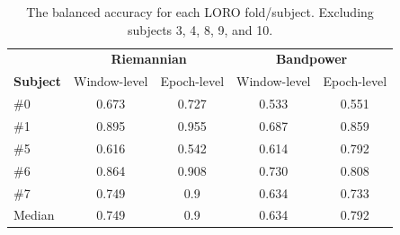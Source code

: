         \begin{table}[h]
            \centering
            \begin{tabular}{lcccc}
                \toprule
                & \multicolumn{2}{c}{\textbf{Riemannian}} & \multicolumn{2}{c}{\textbf{Bandpower}} \\
                \cmidrule(lr){2-3}
                \cmidrule(lr){4-5}
                \textbf{Subject} & Window-level & Epoch-level & Window-level & Epoch-level \\
                \midrule
                \#0 & 0.673 & 0.727 & 0.533 & 0.551 \\
                \#1 & 0.895 & 0.955 & 0.687 & 0.859 \\
                \#5 & 0.616 & 0.542 & 0.614 & 0.792 \\
                \#6 & 0.864 & 0.908 & 0.730 & 0.808 \\
                \#7 & 0.749 & 0.9   & 0.634 & 0.733 \\
                \midrule
                Median & 0.749 & 0.9 & 0.634 & 0.792 \\
                \bottomrule
            \end{tabular}
            \caption{The balanced accuracy for each LORO fold/subject. Excluding subjects 3, 4, 8, 9, and 10.}\label{table:bac-selective}
        \end{table}

